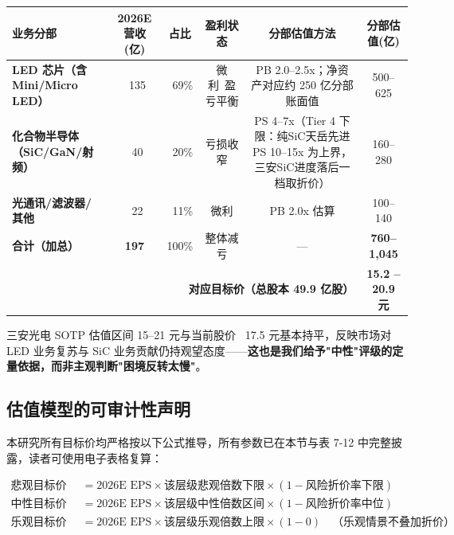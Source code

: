 \begin{exhibitbox}
\centering
\small
\begin{tabularx}{\textwidth}{X c c c c c}
\toprule
\textbf{业务分部} & \textbf{2026E 营收(亿)} & \textbf{占比} & \textbf{盈利状态} & \textbf{分部估值方法} & \textbf{分部估值(亿)} \\
\midrule
\rowcolor{steelgrey!10}
\textbf{LED 芯片（含 Mini/Micro LED）} & ~135 & ~69\% & 微利~盈亏平衡 & PB 2.0–2.5x；净资产对应约 250 亿分部账面值 & 500–625 \\
\midrule
\rowcolor{accentblue!5}
\textbf{化合物半导体（SiC/GaN/射频）} & ~40 & ~20\% & 亏损收窄 & PS 4–7x（Tier 4 下限：纯SiC天岳先进 PS 10–15x 为上界，三安SiC进度落后一档取折价） & 160–280 \\
\midrule
\rowcolor{riskamber!5}
\textbf{光通讯/滤波器/其他} & ~22 & ~11\% & 微利 & PB 2.0x 估算 & 100–140 \\
\midrule
\textbf{合计（加总）} & \textbf{197} & 100\% & 整体减亏 & — & \textbf{760–1,045} \\
\midrule
\midrule
\multicolumn{5}{r}{\textbf{对应目标价（总股本 49.9 亿股）}} & \textbf{15.2 – 20.9 元} \\
\bottomrule
\end{tabularx}
\end{exhibitbox}

三安光电 SOTP 估值区间 15–21 元与当前股价 ~17.5 元基本持平，反映市场对 LED 业务复苏与 SiC 业务贡献仍持观望态度——\textbf{这也是我们给予"中性"评级的定量依据，而非主观判断"困境反转太慢"}。

\subsection{估值模型的可审计性声明}

本研究所有目标价均严格按以下公式推导，所有参数已在本节与表 7-12 中完整披露，读者可使用电子表格复算：

\begin{align*}
\text{悲观目标价下限} &= \text{2026E EPS} \times \text{该层级悲观倍数下限} \times (1 - \text{风险折价率下限}) \\
\text{中性目标价区间} &= \text{2026E EPS} \times \text{该层级中性倍数区间} \times (1 - \text{风险折价率中位}) \\
\text{乐观目标价上限} &= \text{2026E EPS} \times \text{该层级乐观倍数上限} \times (1 - 0) \quad \text{（乐观情景不叠加折价）}
\end{align*}


